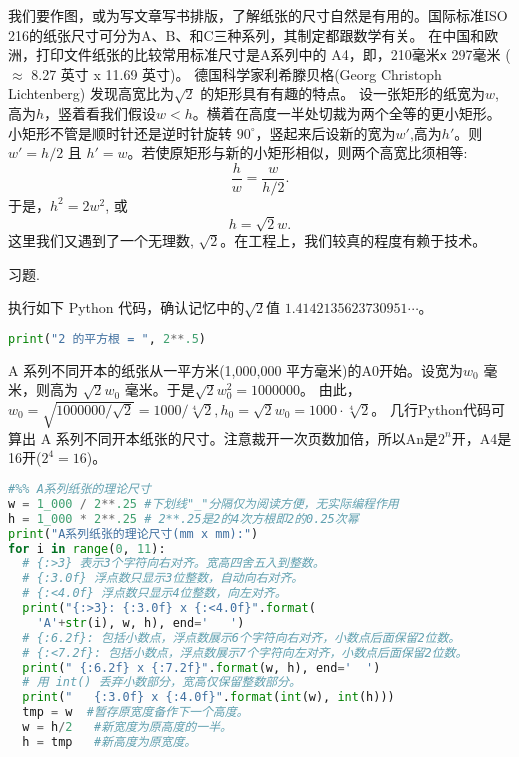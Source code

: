 \documentclass[main.tex]{subfiles}
\begin{document}
我们要作图，或为写文章写书排版，了解纸张的尺寸自然是有用的。国际标准ISO 216的纸张尺寸可分为A、B、和C三种系列，其制定都跟数学有关。
在中国和欧洲，打印文件纸张的比较常用标准尺寸是A系列中的 A4，即，210毫米\texttt{x}{ }297毫米 ($\approx$ 8.27 英寸 x 11.69 英寸)。
 德国科学家利希滕贝格(Georg Christoph Lichtenberg) 发现高宽比为$\sqrt{2}$
的矩形具有有趣的特点。
设一张矩形的纸宽为$w$,高为$h$，竖着看我们假设$w <h$。横着在高度一半处切裁为两个全等的更小矩形。小矩形不管是顺时针还是逆时针旋转 $90^\circ$，竖起来后设新的宽为$w'$,高为$h'$。则
$w' = h/2$ 且 $h' = w$。若使原矩形与新的小矩形相似，则两个高宽比须相等:
$$\frac{h}{w} = \frac{w}{h/2}.   $$
于是，$h^2= 2 w^2$, 或
 $$h= \sqrt{2} w.$$
这里我们又遇到了一个无理数, $\sqrt{2}$。在工程上，我们较真的程度有赖于技术。
	
\begin{kaishu}习题.\end{kaishu} 执行如下 Python 代码，确认记忆中的$\sqrt{2}$值 $1.4142135623730951\cdots$。
\begin{spacing}{0.8}
	\begin{small}
	\begin{lstlisting}[language=Python]
print("2 的平方根 = ", 2**.5)
\end{lstlisting}
\end{small}
\end{spacing}

A 系列不同开本的纸张从一平方米(1,000,000 平方毫米)的A0开始。设宽为$w_0$ 毫米，则高为
$\sqrt{2}w_0$ 毫米。于是$\sqrt{2}w_0^2 = 1000000$。
由此，
$w_0 = \sqrt{1000000/\sqrt{2}}=1000/\sqrt[4]{2}, 
h_0=\sqrt{2}w_0=1000\cdot\sqrt[4]{2}$。
几行Python代码可算出 A 系列不同开本纸张的尺寸。注意裁开一次页数加倍，所以An是$2^n$开，A4是16开($2^4=16$)。

\vspace{.4cm}
\begin{spacing}{0.8}
	\begin{small}
	\begin{lstlisting}[language=Python]
#%% A系列纸张的理论尺寸
w = 1_000 / 2**.25 #下划线"_"分隔仅为阅读方便，无实际编程作用
h = 1_000 * 2**.25 # 2**.25是2的4次方根即2的0.25次幂 
print("A系列纸张的理论尺寸(mm x mm):")
for i in range(0, 11):
  # {:>3} 表示3个字符向右对齐。宽高四舍五入到整数。
  # {:3.0f} 浮点数只显示3位整数，自动向右对齐。
  # {:<4.0f} 浮点数只显示4位整数，向左对齐。
  print("{:>3}: {:3.0f} x {:<4.0f}".format(
    'A'+str(i), w, h), end='   ')
  # {:6.2f}: 包括小数点，浮点数展示6个字符向右对齐，小数点后面保留2位数。
  # {:<7.2f}: 包括小数点，浮点数展示7个字符向左对齐，小数点后面保留2位数。
  print(" {:6.2f} x {:7.2f}".format(w, h), end='  ')
  # 用 int() 丢弃小数部分，宽高仅保留整数部分。
  print("   {:3.0f} x {:4.0f}".format(int(w), int(h)))
  tmp = w  #暂存原宽度备作下一个高度。
  w = h/2   #新宽度为原高度的一半。
  h = tmp   #新高度为原宽度。
\end{lstlisting}
\end{small}
\end{spacing}
\vspace{.4cm}\label{a_paper_py}
\end{document}

